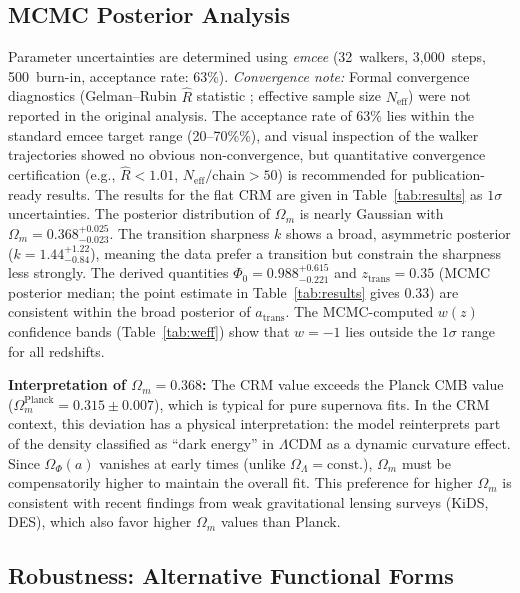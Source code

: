 \documentclass[aps,prd,twocolumn,superscriptaddress,nofootinbib]{revtex4-2}
\begin{document}
\subsection{MCMC Posterior Analysis}
\label{subsec:mcmc}

Parameter uncertainties are determined using \textit{emcee} \cite{ForemanMackey2013} (32~walkers, 3,000~steps, 500~burn-in, acceptance rate: 63\%). \textit{Convergence note:} Formal convergence diagnostics (Gelman--Rubin $\hat{R}$ statistic \cite{GelmanRubin1992}; effective sample size $N_\mathrm{eff}$) were not reported in the original analysis. The acceptance rate of 63\% lies within the standard emcee target range (20--70\%\thinspace\%), and visual inspection of the walker trajectories showed no obvious non-convergence, but quantitative convergence certification (e.g., $\hat{R} < 1.01$, $N_\mathrm{eff}/\mathrm{chain} > 50$) is recommended for publication-ready results. The results for the flat CRM are given in Table~\ref{tab:results} as $1\sigma$ uncertainties. The posterior distribution of $\Omega_m$ is nearly Gaussian with $\Omega_m = 0.368^{+0.025}_{-0.023}$. The transition sharpness $k$ shows a broad, asymmetric posterior ($k = 1.44^{+1.22}_{-0.84}$), meaning the data prefer a transition but constrain the sharpness less strongly. The derived quantities $\Phi_0 = 0.988^{+0.615}_{-0.221}$ and $z_{\mathrm{trans}} = 0.35$ (MCMC posterior median; the point estimate in Table~\ref{tab:results} gives $0.33$) are consistent within the broad posterior of $a_{\mathrm{trans}}$. The MCMC-computed $w(z)$ confidence bands (Table~\ref{tab:weff}) show that $w = -1$ lies outside the $1\sigma$ range for all redshifts.

\textbf{Interpretation of $\Omega_m = 0.368$:} The CRM value exceeds the Planck CMB value ($\Omega_m^{\mathrm{Planck}} = 0.315 \pm 0.007$), which is typical for pure supernova fits. In the CRM context, this deviation has a physical interpretation: the model reinterprets part of the density classified as ``dark energy'' in $\Lambda$CDM as a dynamic curvature effect. Since $\Omega_\Phi(a)$ vanishes at early times (unlike $\Omega_\Lambda = \mathrm{const.}$), $\Omega_m$ must be compensatorily higher to maintain the overall fit. This preference for higher $\Omega_m$ is consistent with recent findings from weak gravitational lensing surveys (KiDS, DES), which also favor higher $\Omega_m$ values than Planck.


\subsection{Robustness: Alternative Functional Forms}
\label{subsec:funcforms}
\end{document}
